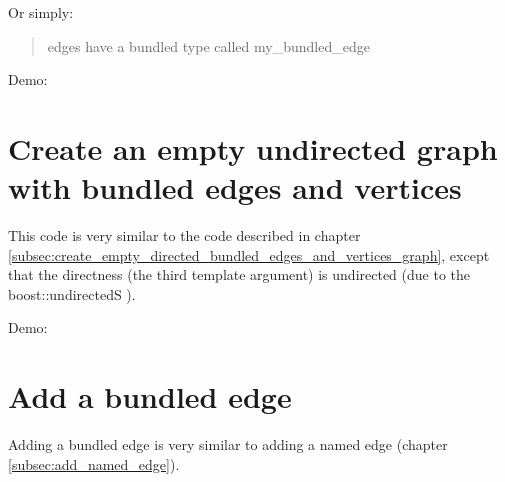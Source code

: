Or simply: 

\begin{quote}
edges have a bundled type called my\_bundled\_edge
\end{quote}

Demo:



\section{Create an empty undirected graph with bundled edges and vertices}
\label{subsec:create_empty_undirected_bundled_edges_and_vertices_graph}



This code is very similar to the code described in chapter 
\ref{subsec:create_empty_directed_bundled_edges_and_vertices_graph}, 
except that the directness (the third template argument) is undirected
 (due to the boost::undirectedS ).

Demo:



\section{Add a bundled edge}
\label{subsec:add_bundled_edge}

Adding a bundled edge is very similar to adding a named edge (chapter 
\ref{subsec:add_named_edge}).

